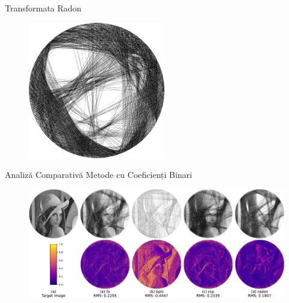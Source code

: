 \documentclass[aspectratio=169,xcolor=dvipsnames]{beamer}
\begin{document}
\begin{frame}{Transformata Radon}
\begin{figure}[H]
\begin{minipage}{0.2\linewidth}
        \end{minipage}
    \hspace{0.02\linewidth}
        \begin{minipage}{0.2\linewidth}
            \centering
            \includegraphics[width=\linewidth]{images/mary_radon.png}
        \end{minipage}
\end{figure}
\end{frame}

\begin{frame}{Analiză Comparativă Metode cu Coeficienți Binari}
    \begin{figure}
        \includegraphics[width=0.9\linewidth]{images/diff_images_binary.pdf}
    \end{figure}
\end{frame}
\end{document}
